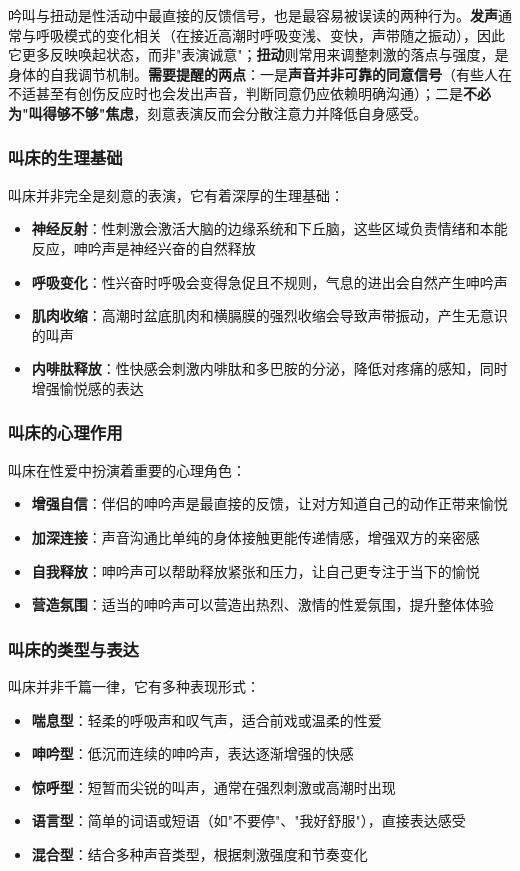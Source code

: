 \documentclass[12pt,UTF8]{ctexbook}
\begin{document}
吟叫与扭动是性活动中最直接的反馈信号，也是最容易被误读的两种行为。\textbf{发声}通常与呼吸模式的变化相关（在接近高潮时呼吸变浅、变快，声带随之振动），因此它更多反映唤起状态，而非"表演诚意"；\textbf{扭动}则常用来调整刺激的落点与强度，是身体的自我调节机制。\textbf{需要提醒的两点}：一是\textbf{声音并非可靠的同意信号}（有些人在不适甚至有创伤反应时也会发出声音，判断同意仍应依赖明确沟通）；二是\textbf{不必为"叫得够不够"焦虑}，刻意表演反而会分散注意力并降低自身感受。

\subsubsection{叫床的生理基础}
叫床并非完全是刻意的表演，它有着深厚的生理基础：
\begin{itemize}
\item \textbf{神经反射}：性刺激会激活大脑的边缘系统和下丘脑，这些区域负责情绪和本能反应，呻吟声是神经兴奋的自然释放
\item \textbf{呼吸变化}：性兴奋时呼吸会变得急促且不规则，气息的进出会自然产生呻吟声
\item \textbf{肌肉收缩}：高潮时盆底肌肉和横膈膜的强烈收缩会导致声带振动，产生无意识的叫声
\item \textbf{内啡肽释放}：性快感会刺激内啡肽和多巴胺的分泌，降低对疼痛的感知，同时增强愉悦感的表达
\end{itemize}

\subsubsection{叫床的心理作用}
叫床在性爱中扮演着重要的心理角色：
\begin{itemize}
\item \textbf{增强自信}：伴侣的呻吟声是最直接的反馈，让对方知道自己的动作正带来愉悦
\item \textbf{加深连接}：声音沟通比单纯的身体接触更能传递情感，增强双方的亲密感
\item \textbf{自我释放}：呻吟声可以帮助释放紧张和压力，让自己更专注于当下的愉悦
\item \textbf{营造氛围}：适当的呻吟声可以营造出热烈、激情的性爱氛围，提升整体体验
\end{itemize}

\subsubsection{叫床的类型与表达}
叫床并非千篇一律，它有多种表现形式：
\begin{itemize}
\item \textbf{喘息型}：轻柔的呼吸声和叹气声，适合前戏或温柔的性爱
\item \textbf{呻吟型}：低沉而连续的呻吟声，表达逐渐增强的快感
\item \textbf{惊呼型}：短暂而尖锐的叫声，通常在强烈刺激或高潮时出现
\item \textbf{语言型}：简单的词语或短语（如"不要停"、"我好舒服"），直接表达感受
\item \textbf{混合型}：结合多种声音类型，根据刺激强度和节奏变化
\end{itemize}
\end{document}
